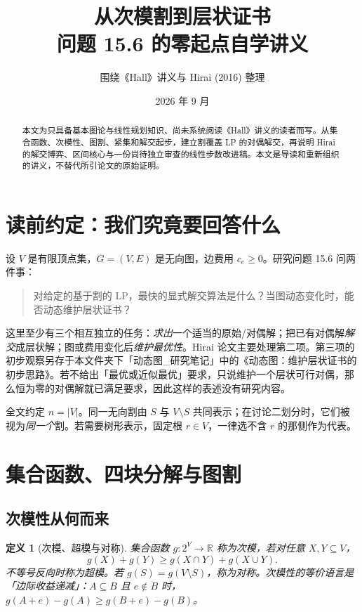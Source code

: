 \documentclass[UTF8,11pt,a4paper]{ctexart}
\title{从次模割到层状证书\\\large 问题 15.6 的零起点自学讲义}
\author{围绕《Hall》讲义与 Hirai (2016) 整理}
\date{2026 年 9 月}
\newtheorem{definition}{定义}[section]
\newcommand{\R}{\mathbb R}
\begin{document}
\maketitle
\begin{abstract}
本文为只具备基本图论与线性规划知识、尚未系统阅读《Hall》讲义的读者而写。从集合函数、次模性、图割、紧集和解交起步，建立割覆盖 LP 的对偶解交，再说明 Hirai 的解交博弈、区间核心与一份尚待独立审查的线性步数改进稿。本文是导读和重新组织的讲义，不替代所引论文的原始证明。
\end{abstract}

\tableofcontents

\section{读前约定：我们究竟要回答什么}

设 $V$ 是有限顶点集，$G=(V,E)$ 是无向图，边费用 $c_e\ge0$。研究问题 15.6 问两件事：
\begin{quote}
对给定的基于割的 LP，最快的显式解交算法是什么？当图动态变化时，能否动态维护层状证书？
\end{quote}
这里至少有三个相互独立的任务：\emph{求出}一个适当的原始/对偶解；把已有对偶解\emph{解交}成层状解；图或费用变化后\emph{维护最优性}。Hirai 论文主要处理第二项。第三项的初步观察另存于本文件夹下「动态图\_研究笔记」中的《动态图：维护层状证书的初步思路》。若不给出「最优或近似最优」要求，只说维护一个层状可行对偶，那么恒为零的对偶解就已满足要求，因此这样的表述没有研究内容。

全文约定 $n=|V|$。同一无向割由 $S$ 与 $V\setminus S$ 共同表示；在讨论二划分时，它们被视为\emph{同一个}割。若需要树形表示，固定根 $r\in V$，一律选不含 $r$ 的那侧作为代表。

\section{集合函数、四块分解与图割}

\subsection{次模性从何而来}

\begin{definition}[次模、超模与对称]
集合函数 $g:2^V\to\R$ 称为\emph{次模}，若对任意 $X,Y\subseteq V$，
\begin{equation}\label{eq:submod}
g(X)+g(Y)\ge g(X\cap Y)+g(X\cup Y).
\end{equation}
不等号反向时称为超模。若 $g(S)=g(V\setminus S)$，称为对称。次模性的等价语言是「边际收益递减」：$A\subseteq B$ 且 $e\notin B$ 时，$g(A+e)-g(A)\ge g(B+e)-g(B)$。
\end{definition}
\end{document}

